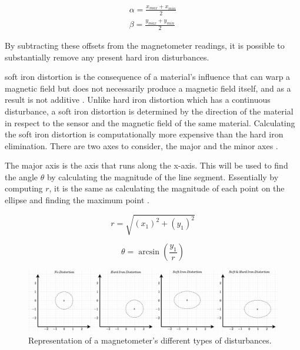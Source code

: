 \begin{equation}
    \begin{gathered}
        \alpha = \frac{x_{max}+x_{min}}{2}\\
        \beta = \frac{y_{max}+y_{min}}{2}
    \end{gathered}
\end{equation}

By subtracting these offsets from the magnetometer readings, it is possible to substantially remove any present hard iron disturbances.

soft iron distortion is the consequence of a material's influence that can warp a magnetic field but does not necessarily produce a magnetic field itself, and as a result is not additive \cite{bachmann2004investigation}. Unlike hard iron distortion which has a continuous disturbance, a soft iron distortion is determined by the direction of the material in respect to the sensor and the magnetic field of the same material. Calculating the soft iron distortion is computationally more expensive than the hard iron elimination. There are two axes to consider, the major and the minor axes \cite{roetenberg2005compensation}.

The major axis is the axis that runs along the x-axis. This will be used to find the angle $\theta$ by calculating the magnitude of the line segment. Essentially by computing $r$, it is the same as calculating the magnitude of each point on the ellipse and finding the maximum point \cite{daponte2017method}.

\begin{equation}
    r=\sqrt{(x_1)^2+(y_1)^2}
\end{equation}

\begin{equation}
    \theta=\arcsin(\frac{y_1}{r})
\end{equation}

\begin{figure}[!h]
    \centering
    \includegraphics[width=1\textwidth]{figures/magnetometer_distortion.pdf}
    \caption{Representation of a magnetometer's different types of disturbances. \cite{daponte2017method} }
    \label{fig:magnetometer_distortion}
\end{figure}

